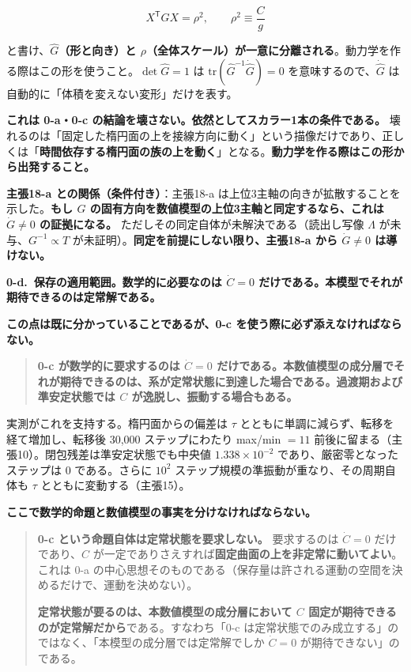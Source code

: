 \documentclass[
  10pt,
]{ltjsarticle}
\begin{document}
\[X^{\mathsf T}\widehat{G}X = \rho^2, \qquad \rho^2 \equiv \frac{C}{g}\]

と書け、\textbf{\(\widehat G\)（形と向き）と
\(\rho\)（全体スケール）が一意に分離される}。動力学を作る際はこの形を使うこと。\(\det\widehat G = 1\)
は \(\mathrm{tr}(\widehat G^{-1}\dot{\widehat G}) = 0\)
を意味するので、\(\dot{\widehat G}\)
は自動的に「体積を変えない変形」だけを表す。

\textbf{これは 0-a・0-c
の結論を壊さない。依然としてスカラー1本の条件である。}
壊れるのは「固定した楕円面の上を接線方向に動く」という描像だけであり、正しくは「\textbf{時間依存する楕円面の族の上を動く}」となる。\textbf{動力学を作る際はこの形から出発すること。}

\textbf{主張18-a との関係（条件付き）}：主張18-a
は上位3主軸の向きが拡散することを示した。\textbf{もし \(G\)
の固有方向を数値模型の上位3主軸と同定するなら、これは \(\dot G \ne 0\)
の証拠になる。} ただしその同定自体が未解決である（読出し写像 \(\Lambda\)
が未与、\(G^{-1}\propto T\)
が未証明）。\textbf{同定を前提にしない限り、主張18-a から
\(\dot G \ne 0\) は導けない。}

\textbf{0-d.~保存の適用範囲。数学的に必要なのは \(\dot C=0\)
だけである。本模型でそれが期待できるのは定常解である。}

\textbf{この点は既に分かっていることであるが、0-c
を使う際に必ず添えなければならない。}

\begin{quote}
\textbf{0-c が数学的に要求するのは \(\dot C = 0\)
だけである。本数値模型の成分層でそれが期待できるのは、系が定常状態に到達した場合である。過渡期および準安定状態では
\(C\) が逸脱し、振動する場合もある。}
\end{quote}

実測がこれを支持する。楕円面からの偏差は \(\tau\)
とともに単調に減らず、転移を経て増加し、転移後 30,000 ステップにわたり
max/min \(= 11\) 前後に留まる（主張10）。閉包残差は準安定状態でも中央値
\(1.338\times10^{-2}\) であり、厳密零となったステップは \(0\)
である。さらに \(10^2\) ステップ規模の準振動が重なり、その周期自体も
\(\tau\) とともに変動する（主張15）。

\textbf{ここで数学的命題と数値模型の事実を分けなければならない。}

\begin{quote}
\textbf{0-c という命題自体は定常状態を要求しない。} 要求するのは
\(\dot C = 0\) だけであり、\(C\)
が一定でありさえすれば\textbf{固定曲面の上を非定常に動いてよい}。これは
0-a
の中心思想そのものである（保存量は許される運動の空間を決めるだけで、運動を決めない）。

\textbf{定常状態が要るのは、本数値模型の成分層において \(C\)
固定が期待できるのが定常解だから}である。すなわち「0-c
は定常状態でのみ成立する」のではなく、「本模型の成分層では定常解でしか
\(\dot C=0\) が期待できない」のである。
\end{quote}
\end{document}
